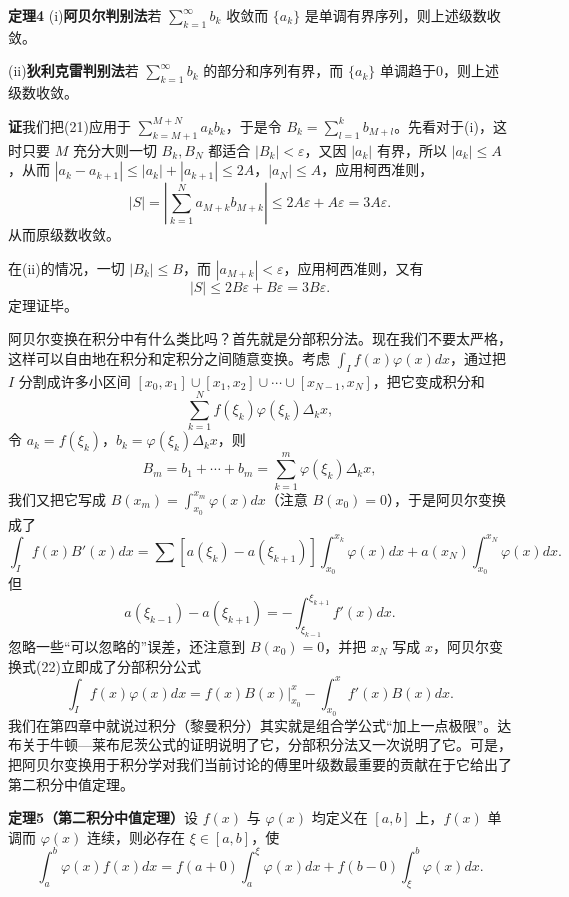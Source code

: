 \noindent\textbf{定理4}\quad
(i)\textbf{阿贝尔判别法}\quad 若 $\sum_{k=1}^{\infty}b_k$ 收敛而 $\{a_k\}$ 是单调有界序列，则上述级数收敛。

(ii)\textbf{狄利克雷判别法}\quad 若 $\sum_{k=1}^{\infty}b_k$ 的部分和序列有界，而 $\{a_k\}$ 单调趋于0，则上述级数收敛。

\noindent\textbf{证}\quad 我们把(21)应用于 $\sum_{k=M+1}^{M+N}a_kb_k$，于是令 $B_k=\sum_{l=1}^{k}b_{M+l}$。先看对于(i)，这时只要 $M$ 充分大则一切 $B_k,B_N$ 都适合 $|B_k|<\varepsilon$，又因 $|a_k|$ 有界，所以 $|a_k|\le A$，从而 $|a_k-a_{k+1}|\le|a_k|+|a_{k+1}|\le2A$，$|a_N|\le A$，应用柯西准则，
\[
 |S|=\left|\sum_{k=1}^{N}a_{M+k}b_{M+k}\right|\le2A\varepsilon+A\varepsilon=3A\varepsilon.
\]
从而原级数收敛。

在(ii)的情况，一切 $|B_k|\le B$，而 $|a_{M+k}|<\varepsilon$，应用柯西准则，又有
\[
 |S|\le2B\varepsilon+B\varepsilon=3B\varepsilon.
\]
定理证毕。

阿贝尔变换在积分中有什么类比吗？首先就是分部积分法。现在我们不要太严格，这样可以自由地在积分和定积分之间随意变换。考虑 $\int_I f(x)\varphi(x)dx$，通过把 $I$ 分割成许多小区间 $[x_0,x_1]\cup[x_1,x_2]\cup\cdots\cup[x_{N-1},x_N]$，把它变成积分和
\[
 \sum_{k=1}^{N}f(\xi_k)\varphi(\xi_k)\Delta_kx,
\]
令 $a_k=f(\xi_k)$，$b_k=\varphi(\xi_k)\Delta_kx$，则
\[
 B_m=b_1+\cdots+b_m=\sum_{k=1}^{m}\varphi(\xi_k)\Delta_kx,
\]
我们又把它写成 $B(x_m)=\int_{x_0}^{x_m}\varphi(x)dx$（注意 $B(x_0)=0$），于是阿贝尔变换成了
\begin{equation}
 \int_I f(x)B'(x)dx
 =\sum [a(\xi_k)-a(\xi_{k+1})]\int_{x_0}^{x_k}\varphi(x)dx
 +a(x_N)\int_{x_0}^{x_N}\varphi(x)dx.
 \tag{22}
\end{equation}
但
\[
 a(\xi_{k-1})-a(\xi_{k+1})=-\int_{\xi_{k-1}}^{\xi_{k+1}}f'(x)dx.
\]
忽略一些“可以忽略的”误差，还注意到 $B(x_0)=0$，并把 $x_N$ 写成 $x$，阿贝尔变换式(22)立即成了分部积分公式
\[
 \int_I f(x)\varphi(x)dx=f(x)B(x)\big|_{x_0}^{x}-\int_{x_0}^{x}f'(x)B(x)dx.
\]
我们在第四章中就说过积分（黎曼积分）其实就是组合学公式“加上一点极限”。达布关于牛顿—莱布尼茨公式的证明说明了它，分部积分法又一次说明了它。可是，把阿贝尔变换用于积分学对我们当前讨论的傅里叶级数最重要的贡献在于它给出了第二积分中值定理。

\noindent\textbf{定理5（第二积分中值定理）}\quad 设 $f(x)$ 与 $\varphi(x)$ 均定义在 $[a,b]$ 上，$f(x)$ 单调而 $\varphi(x)$ 连续，则必存在 $\xi\in[a,b]$，使
\begin{equation}
 \int_a^b\varphi(x)f(x)dx
 =f(a+0)\int_a^{\xi}\varphi(x)dx+f(b-0)\int_{\xi}^{b}\varphi(x)dx.
 \tag{23}
\end{equation}

